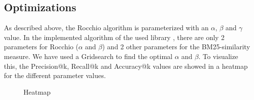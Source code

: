 \documentclass[11pt]{article}
\begin{document}
\subsection{Optimizations}
As described above, the \textsf{Rocchio} algorithm is parameterized with an $\alpha$, $\beta$ and $\gamma$ value. In the implemented algorithm of the used library \cite{rocchio}, there are only 2 parameters for \textsf{Rocchio} ($\alpha$ and $\beta$) and 2 other parameters for the BM25-similarity measure. We have used a Gridsearch to find the optimal $\alpha$ and $\beta$. To visualize this, the \textsf{Precision@k}, \textsf{Recall@k} and \textsf{Accuracy@k} values are showed in a heatmap for the different parameter values.

\begin{figure}[htp]
	\centering
	\hfill
	\par 
	\caption{Heatmap}
	\label{fig:heatmap}
\end{figure}
\end{document}
